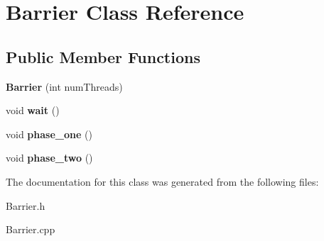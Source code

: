 \hypertarget{class_barrier}{}\section{Barrier Class Reference}
\label{class_barrier}
\subsection*{Public Member Functions}
\begin{DoxyCompactItemize}
\item 
\mbox{\label{class_barrier_a7290fb8952d0f7779b8d6a7a34bbd407}} 
{\bfseries Barrier} (int num\+Threads)
\item 
\mbox{\label{class_barrier_a83a9d2e85e98b3d2081538bf0da29b60}} 
void {\bfseries wait} ()
\item 
\mbox{\label{class_barrier_a5be6d04f7ecfad8c43f741ce5294ebc4}} 
void {\bfseries phase\+\_\+one} ()
\item 
\mbox{\label{class_barrier_a4bc5b771e10a8cf2cd136900f36f7055}} 
void {\bfseries phase\+\_\+two} ()
\end{DoxyCompactItemize}


The documentation for this class was generated from the following files\+:\begin{DoxyCompactItemize}
\item 
Barrier.\+h\item 
Barrier.\+cpp\end{DoxyCompactItemize}
